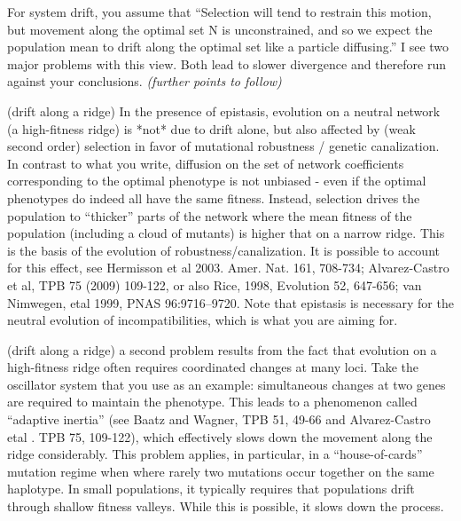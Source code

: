 
\begin{point}{}
    For system drift, you assume that ``Selection will tend to restrain this
motion, but movement along the optimal set N is unconstrained, and so we expect
the population mean to drift along the optimal set like a particle diffusing.''
I see two major problems with this view. Both lead to slower divergence and
therefore run against your conclusions.
    \textit{(further points to follow)}
\end{point}


\begin{point}{(drift along a ridge)}
    In the presence of epistasis, evolution on a neutral network (a high-fitness
  ridge) is *not* due to drift alone, but also affected by (weak second order)
selection in favor of mutational robustness / genetic canalization. In contrast
to what you write, diffusion on the set of network coefficients corresponding
to the optimal phenotype is not unbiased - even if the optimal phenotypes do
indeed all have the same fitness. Instead, selection drives the population to
``thicker'' parts of the network where the mean fitness of the population
(including a cloud of mutants) is higher that on a narrow ridge. This is the
basis of the evolution of robustness/canalization. It is possible to account
for this effect, see Hermisson et al 2003. Amer. Nat. 161, 708-734;
Alvarez-Castro et al, TPB 75 (2009) 109-122, or also Rice, 1998, Evolution 52,
647-656; van Nimwegen, etal 1999, PNAS 96:9716–9720. Note that epistasis is
necessary for the neutral evolution of incompatibilities, which is what you are
aiming for.
\end{point}


\begin{point}{(drift along a ridge)}
    a second problem results from the fact that evolution on a high-fitness ridge
  often requires coordinated changes at many loci. Take the oscillator system
that you use as an example: simultaneous changes at two genes are required to
maintain the phenotype. This leads to a phenomenon called ``adaptive inertia''
(see Baatz and Wagner, TPB 51, 49-66 and Alvarez-Castro etal . TPB 75, 109-122),
which effectively slows down the movement along the ridge considerably. This
problem applies, in particular, in a ``house-of-cards'' mutation regime when
where rarely two mutations occur together on the same haplotype. In small
populations, it typically requires that populations drift through shallow
fitness valleys. While this is possible, it slows down the process.  
\end{point}

